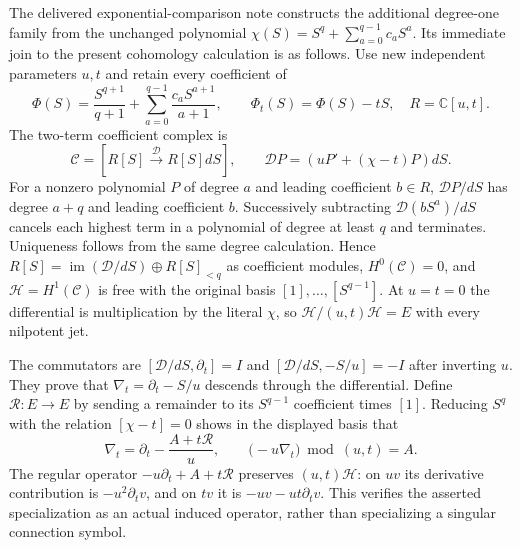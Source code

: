 \documentclass{article}
\begin{document}
The delivered exponential-comparison note constructs the additional
degree-one family from the unchanged polynomial
$\chi(S)=S^q+\sum_{a=0}^{q-1}c_aS^a$.  Its immediate join to the
present cohomology calculation is as follows.  Use new independent
parameters $u,t$ and retain every coefficient of
\[
 \Phi(S)=\frac{S^{q+1}}{q+1}
 +\sum_{a=0}^{q-1}\frac{c_aS^{a+1}}{a+1},\qquad
 \Phi_t(S)=\Phi(S)-tS,
 \quad R=\mathbb C[u,t].
 \tag{DS66}
\]
The two-term coefficient complex is
\[
 \mathcal C=[R[S]\xrightarrow{\mathcal D}R[S]dS],
 \qquad\mathcal D P=(uP'+(\chi-t)P)dS.
 \tag{DS67}
\]
For a nonzero polynomial $P$ of degree $a$ and leading coefficient
$b\in R$, $\mathcal DP/dS$ has degree $a+q$ and leading coefficient
$b$.  Successively subtracting $\mathcal D(bS^a)/dS$ cancels each
highest term in a polynomial of degree at least $q$ and terminates.
Uniqueness follows from the same degree calculation.  Hence
$R[S]=\operatorname{im}(\mathcal D/dS)\oplus R[S]_{<q}$ as
coefficient modules, $H^0(\mathcal C)=0$, and
$\mathcal H=H^1(\mathcal C)$ is free with the original basis
$[1],\ldots,[S^{q-1}]$.  At $u=t=0$ the differential is
multiplication by the literal $\chi$, so
$\mathcal H/(u,t)\mathcal H=E$ with every nilpotent jet.

The commutators are
$[\mathcal D/dS,\partial_t]=I$ and
$[\mathcal D/dS,-S/u]=-I$ after inverting $u$.  They prove that
$\nabla_t=\partial_t-S/u$ descends through the differential.
Define $\mathcal R:E\to E$ by sending a remainder to its
$S^{q-1}$ coefficient times $[1]$.  Reducing $S^q$ with the relation
$[\chi-t]=0$ shows in the displayed basis that
\[
 \nabla_t=\partial_t-\frac{A+t\mathcal R}{u},\qquad
 \bigl(-u\nabla_t\bigr)\bmod(u,t)=A.
 \tag{DS68}
\]
The regular operator $-u\partial_t+A+t\mathcal R$ preserves
$(u,t)\mathcal H$: on $uv$ its derivative contribution is
$-u^2\partial_tv$, and on $tv$ it is $-uv-ut\partial_tv$.
This verifies the asserted specialization as an actual induced
operator, rather than specializing a singular connection symbol.
\end{document}
